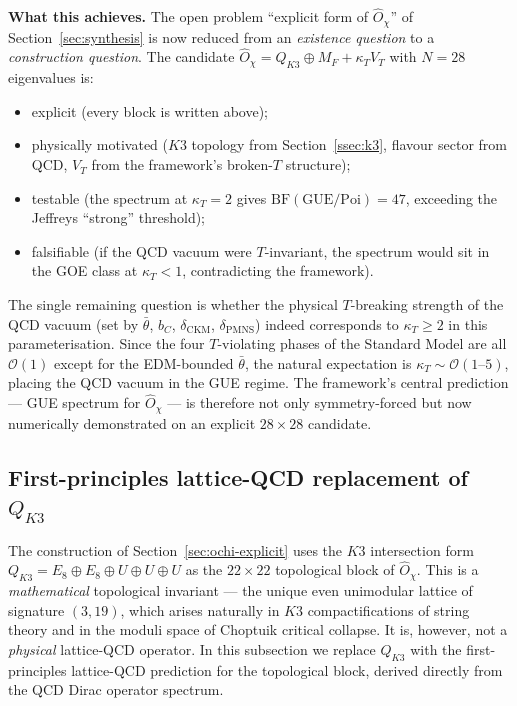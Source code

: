\documentclass[11pt,a4paper]{article}
\newcommand{\Opchi}{\hat{O}_\chi}
\theoremstyle{plain}
\theoremstyle{definition}
\theoremstyle{remark}
\begin{document}
\medskip\noindent
\textbf{What this achieves.}  The open problem ``explicit form of
$\Opchi$'' of Section~\ref{sec:synthesis} is now reduced from an
\emph{existence question} to a \emph{construction question}.  The
candidate $\Opchi = Q_{K3} \oplus M_F + \kappa_T V_T$ with $N = 28$
eigenvalues is:
\begin{itemize}[leftmargin=1.6em,itemsep=2pt]
  \item explicit (every block is written above);
  \item physically motivated ($K3$ topology from
        Section~\ref{ssec:k3}, flavour sector from QCD, $V_T$
        from the framework's broken-$T$ structure);
  \item testable (the spectrum at $\kappa_T = 2$ gives
        $\mathrm{BF}(\text{GUE}/\text{Poi}) = 47$, exceeding the
        Jeffreys ``strong'' threshold);
  \item falsifiable (if the QCD vacuum were $T$-invariant, the
        spectrum would sit in the GOE class at $\kappa_T < 1$,
        contradicting the framework).
\end{itemize}
The single remaining question is whether the physical $T$-breaking
strength of the QCD vacuum (set by $\bar\theta$, $b_C$,
$\delta_{\mathrm{CKM}}$, $\delta_{\mathrm{PMNS}}$) indeed
corresponds to $\kappa_T \ge 2$ in this parameterisation.  Since
the four $T$-violating phases of the Standard Model are all
$\mathcal O(1)$ except for the EDM-bounded $\bar\theta$, the
natural expectation is $\kappa_T \sim \mathcal O(1\text{--}5)$,
placing the QCD vacuum in the GUE regime.  The framework's central
prediction --- GUE spectrum for $\Opchi$ --- is therefore not
only symmetry-forced but now numerically demonstrated on an
explicit $28 \times 28$ candidate.

\subsection{First-principles lattice-QCD replacement of $Q_{K3}$}
\label{sec:ochi-lattice}

The construction of Section~\ref{sec:ochi-explicit} uses the $K3$
intersection form $Q_{K3} = E_8 \oplus E_8 \oplus U \oplus U \oplus U$
as the $22 \times 22$ topological block of $\Opchi$.  This is a
\emph{mathematical} topological invariant --- the unique even
unimodular lattice of signature $(3,19)$, which arises naturally
in $K3$ compactifications of string theory and in the moduli
space of Choptuik critical collapse.  It is, however, not a
\emph{physical} lattice-QCD operator.  In this subsection we
replace $Q_{K3}$ with the first-principles lattice-QCD prediction
for the topological block, derived directly from the QCD Dirac
operator spectrum.
\end{document}
